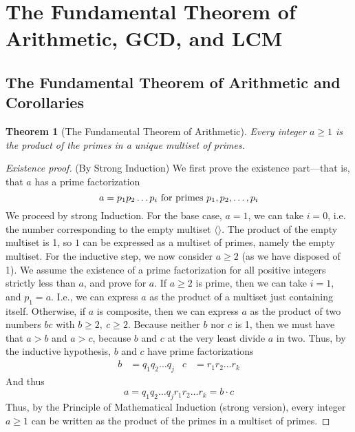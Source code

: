 \documentclass[10pt]{article}
\newtheorem{theorem}{Theorem}[section]
\theoremstyle{definition}
\begin{document}
\section{The Fundamental Theorem of Arithmetic, GCD, and LCM}
\subsection{The Fundamental Theorem of Arithmetic and Corollaries}
\begin{theorem}[The Fundamental Theorem of Arithmetic]
Every integer $a\geq 1$ is the product of the primes in a unique multiset of primes.
\end{theorem}
\begin{proof}[Existence proof](By Strong Induction) We first prove the existence part---that is, that $a$ has a prime factorization
\[ 
a = p_1 p_2\ldots p_i \textnormal{~for primes $p_1,p_2,\ldots,p_i$}
\]
We proceed by strong Induction.  For the base case, $a=1$, we can take $i=0$, i.e. the number corresponding to the empty multiset $\langle \rangle$.  The product of the empty multiset is 1, so $1$ can be expressed as a multiset of primes, namely the empty multiset.  For the inductive step, we now consider $a\geq 2$ (as we have disposed of 1).  We assume the existence of a prime factorization for all positive integers strictly less than $a$, and prove for $a$.  If $a\geq 2$ is prime, then we can take $i=1$, and $p_1=a$.  I.e., we can express $a$ as the product of a multiset just containing itself.  Otherwise, if $a$ is composite, then we can express $a$ as the product of two numbers $bc$ with $b\geq 2,~c\geq 2$.  Because neither $b$ nor $c$ is 1, then we must have that $a>b$ and $a>c$, because $b$ and $c$ at the very least divide $a$ in two.  Thus, by the inductive hypothesis, $b$ and $c$ have prime factorizations 
\begin{align*}
b &= q_1 q_2\ldots q_j & c &= r_1 r_2\ldots r_k
\end{align*}
And thus 
\[a = q_1q_2\ldots q_j r_1 r_2 \ldots r_k = b\cdot c
\]
Thus, by the Principle of Mathematical Induction (strong version), every integer $a\geq 1$ can be written as the product of the primes in a multiset of primes.
\end{proof}~\\
\end{document}
